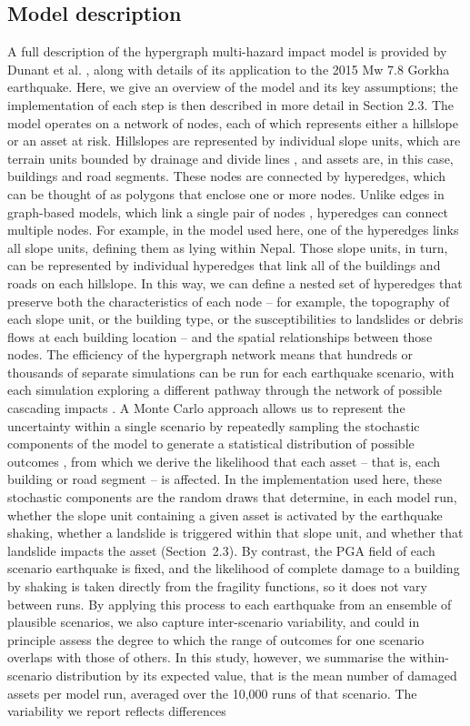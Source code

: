 \documentclass[preprint,12pt,authoryear]{elsarticle}
\begin{document}
\subsection{Model description}

A full description of the hypergraph multi-hazard impact model is provided by Dunant et al. \citep{Dunant2025}, along with details of its application to the 2015 Mw 7.8 Gorkha earthquake. Here, we give an overview of the model and its key assumptions; the implementation of each step is then described in more detail in Section 2.3. The model operates on a network of nodes, each of which represents either a hillslope or an asset at risk. Hillslopes are represented by individual slope units, which are terrain units bounded by drainage and divide lines \citep{Alvioli2016}, and assets are, in this case, buildings and road segments. These nodes are connected by hyperedges, which can be thought of as polygons that enclose one or more nodes. Unlike edges in graph-based models, which link a single pair of nodes \citep{Dunant2021}, hyperedges can connect multiple nodes. For example, in the model used here, one of the hyperedges links all slope units, defining them as lying within Nepal. Those slope units, in turn, can be represented by individual hyperedges that link all of the buildings and roads on each hillslope. In this way, we can define a nested set of hyperedges that preserve both the characteristics of each node -- for example, the topography of each slope unit, or the building type, or the susceptibilities to landslides or debris flows at each building location -- and the spatial relationships between those nodes. The efficiency of the hypergraph network means that hundreds or thousands of separate simulations can be run for each earthquake scenario, with each simulation exploring a different pathway through the network of possible cascading impacts \citep{Dunant2025}. A Monte Carlo approach allows us to represent the uncertainty within a single scenario by repeatedly sampling the stochastic components of the model to generate a statistical distribution of possible outcomes \citep{dunant2021multihazards}, from which we derive the likelihood that each asset -- that is, each building or road segment -- is affected. In the implementation used here, these stochastic components are the random draws that determine, in each model run, whether the slope unit containing a given asset is activated by the earthquake shaking, whether a landslide is triggered within that slope unit, and whether that landslide impacts the asset (Section~2.3). By contrast, the PGA field of each scenario earthquake is fixed, and the likelihood of complete damage to a building by shaking is taken directly from the fragility functions, so it does not vary between runs. By applying this process to each earthquake from an ensemble of plausible scenarios, we also capture inter-scenario variability, and could in principle assess the degree to which the range of outcomes for one scenario overlaps with those of others. In this study, however, we summarise the within-scenario distribution by its expected value, that is the mean number of damaged assets per model run, averaged over the 10,000 runs of that scenario. The variability we report reflects differences 
\end{document}
